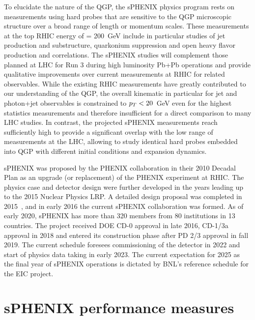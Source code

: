 To elucidate the nature of the QGP, the sPHENIX physics program rests on measurements using hard probes that are sensitive to the QGP microscopic structure over a broad range of length or momentum scales. These measurements at the top RHIC energy of \rootsnn = 200~GeV include in particular studies of jet production and substructure, quarkonium suppression and open heavy flavor production and correlations. The sPHENIX studies will complement those planned at LHC for Run 3 during high luminosity Pb+Pb operations and provide qualitative improvements over current measurements at RHIC for related observables. While the existing RHIC measurements have greatly contributed to our understanding of the QGP, the overall kinematic in particular for jet and photon+jet observables is constrained to $\mbox{${p_T}$} < 20$~GeV even for the highest statistics measurements and therefore insufficient for a direct comparison to many LHC studies. In contrast, the projected sPHENIX measurements reach sufficiently high \pt to provide a significant overlap with the low range of measurements at the LHC, allowing to study identical hard probes embedded into QGP with different initial conditions and expansion dynamics.

sPHENIX was proposed by the PHENIX collaboration in their 2010 Decadal Plan as an upgrade (or replacement) of the PHENIX experiment at RHIC. The physics case and detector design were further developed in the years leading up to the 2015 Nuclear Physics LRP. A detailed design proposal was completed in 2015~\cite{sPHENIX:2015irh}, and in early 2016 the current sPHENIX collaboration was formed. As of early 2020, sPHENIX has more than 320 members from 80 institutions in 13 countries. The project received DOE CD-0 approval in late 2016, CD-1/3a approval in 2018 and entered its construction phase after PD 2/3 approval in fall 2019. The current schedule foresees commissioning of the detector in 2022 and start of physics data taking in early 2023. The current expectation for 2025 as the final year of sPHENIX operations is dictated by BNL's reference schedule for the EIC project.

\section{sPHENIX performance measures}

